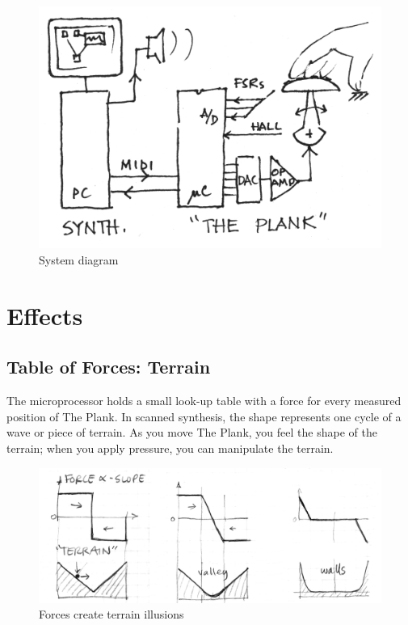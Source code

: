 \begin{figure}[ht]
\centering

\includegraphics[width=11.3cm]{Plank5}
%
%
\caption{System diagram}
\label{Verplank:fig:5}       %
\end{figure}

\section{Effects}

\subsection{Table of Forces: Terrain}
\label{Verplank:sub:4_1}
The microprocessor holds a small look-up table with a force for every measured position of The Plank. In scanned synthesis, the shape represents one cycle of a wave or piece of terrain. As you move The Plank, you feel the shape of the terrain; when you apply pressure, you can manipulate the terrain.


\begin{figure}[ht]
\centering

\includegraphics[width=11.3cm]{Plank6}
%
%
\caption{Forces create terrain illusions}
\label{Verplank:fig:plank6}       %
\end{figure}

